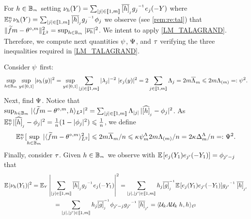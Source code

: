 \begin{pro}\label{pro:conc}
For  $\He\in\mBaH$ setting
$\nu_{\He}(\rY)=\sum_{|j|\in\nset{1,\Di}}\ofHe{j}\fedfI[j]\bas_j(-\rY)$ where
 $\FuEx[\ssY]{\rY}\nu_{\He}(\rY)=\sum_{|j|\in\nset{1,\Di}}\ofHe{j}\fedfI[j]\fydf[j]$
 we observe (see \cref{rem:re:tal}) that
 $\VnormLp{\txdfPr-\xdfPr}^2=\sup_{\He\in\mBaH}|\overline{\nu_{\He}}|^2$. We
 intent to apply \cref{LM_TALAGRAND}. Therefore,  we compute  next quantities $\Tch$, $\TcH$,
and $\Tcv$  verifying the three  inequalities required in
\cref{LM_TALAGRAND}.

\noindent Consider $\Tch$ first:
\begin{align*}
    \sup_{\He\in\mBaH}\sup_{y\in[0,1]}|\nu_{\He}(y)|^2 
    =\sup_{y\in[0,1]} \sum_{|j|\in\nset{1,\Di}} |\fedf[j]|^{-2}\;|\bas_j(y)|^2
  = 2\sum_{j\in\nset{1,\Di}} \iSv[j] = 2\Di\oiSv\leq 2\Di\miSv=:\Tch^2.
  \end{align*}
\noindent Next, find  $\TcH$. Notice that $\sup_{\He\in\mBaH} |\VskalarLp{\txdfPr-\xdfPr,\He}|^2= \sum_{|j|\in\nset{1,\Di}}\iSv[|j|]\,|\hfydf[j]-\fydf[j]|^2$.  As $\FuEx[\ssY]{\rY}|\hfydf[j]-\fydf[j]|^2=\tfrac{1}{\ssY}(1-|\fydf[j]|^2)\leq \tfrac{1}{\ssY}$, we define
\begin{equation*}
\FuEx[\ssY]{\rY}[\sup_{\He\in\mBaH} |\VskalarLp{\txdfPr-\xdfPr}^2] 
\leq 2\Di\oiSv/\ssY\leq \cpen\cmSv2\Di\miSv/\ssY= 2\cpen\DipenSv/\ssY  =: \TcH^2.
\end{equation*}
\noindent Finally, consider $\Tcv$.  Given $\He\in \mBaH$  we observe
with $\FuEx[]{}[\bas_j(Y_1)\bas_{j'}(-Y_1)]=\fydf[j'-j]$
that
\begin{multline*}
  \FuEx[]{}|\nu_{\He}(Y_1)|^2=\FuEx[]{\rY}\lVabs{\sum_{|j|\in\nset{1,\Di}}\ofHe{j}\fedfI[j]\bas_j(-Y_1)}^2
=\sum_{|j|,|j'|\in\nset{1,\Di}}\fHe{j}\ofedfI[j]\FuEx[]{}[\bas_j(Y_1)\bas_{j'}(-Y_1)] \fedfI[j']\,\ofHe{j'}\\
=\sum_{|j|,|j'|\in\nset{1,\Di}}\fHe{j}\ofedfI[j]\fydf[j'-j] \fedfI[j']\,\ofHe{j'}
=\Vskalarlp{\DiPro[k]A\DiPro[k]\;\fHe{},\fHe{}}

\end{multline*}
\end{pro}
